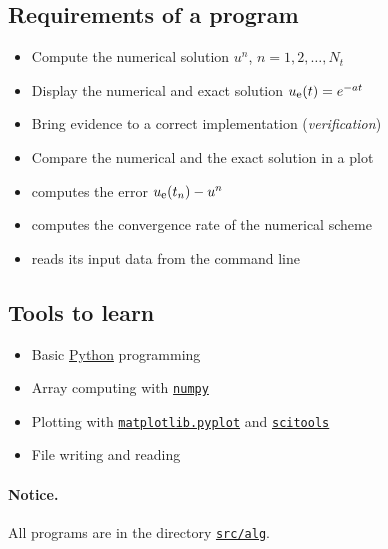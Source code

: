 \documentclass[%
oneside,                 %
final,                   %
10pt]{article}
\begin{document}
\noindent
\subsection*{Requirements of a program}

\begin{itemize}
  \item Compute the numerical solution $u^n$, $n=1,2,\ldots,N_t$

  \item Display the numerical and exact solution $\uex(t)=e^{-at}$

  \item Bring evidence to a correct implementation (\emph{verification})

  \item Compare the numerical and the exact solution in a plot

  \item computes the error $\uex (t_n) - u^n$

  \item computes the convergence rate of the numerical scheme

  \item reads its input data from the command line
\end{itemize}

\noindent
\subsection*{Tools to learn}

\begin{itemize}
  \item Basic \href{{http://python.org}}{Python} programming

  \item Array computing with \href{{http://numpy.org/}}{\nolinkurl{numpy}}

  \item Plotting with \href{{http://matplotlib.sourceforge.net/}}{\nolinkurl{matplotlib.pyplot}} and \href{{https://github.com/hplgit/scitools/}}{\nolinkurl{scitools}}

  \item File writing and reading
\end{itemize}

\noindent

\paragraph{Notice.}
All programs are in the directory
\href{{http://tinyurl.com/ofkw6kc/alg}}{\nolinkurl{src/alg}}.
\end{document}
